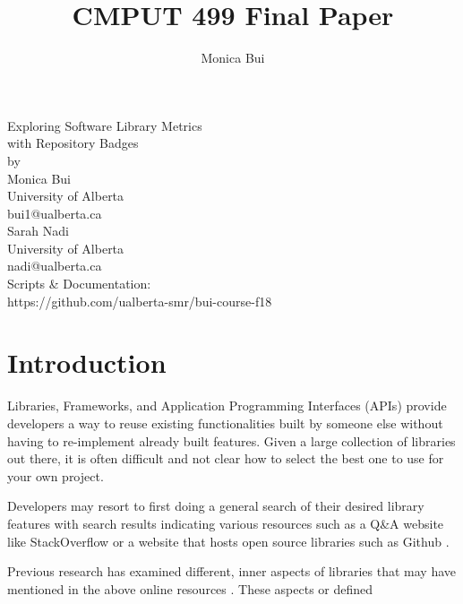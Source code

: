 \documentclass[12pt, letterpaper]{article}
\title{CMPUT 499 Final Paper}
\author{Monica Bui}
\begin{document}
\begin{titlepage}
    \centering
    \large
    \vspace{1cm}
    Exploring Software Library Metrics \\ 
    with Repository Badges \\
    \vspace{1cm}
    by \\
    \vspace{1cm}
    Monica Bui \\
    University of Alberta \\
    bui1@ualberta.ca \\
    \vspace{1cm}
    Sarah Nadi \\
    University of Alberta \\
    nadi@ualberta.ca \\
    \vspace{10cm}
    Scripts \& Documentation: \\
    https://github.com/ualberta-smr/bui-course-f18
\end{titlepage}

\tableofcontents

\listoffigures
\newpage

\section{Introduction} 

Libraries, Frameworks, and Application Programming Interfaces (APIs) provide developers a way to reuse existing functionalities
built by someone else without having to re-implement already built features. Given a large collection of libraries out there,
it is often difficult and not clear how to select the best one to use for your own project. 


Developers may resort to first doing a general search of their desired library features with search results indicating
various resources such as a Q\&A website like StackOverflow \cite{stackoverflow} or a website that hosts open source libraries such as Github \cite{github}.


Previous research has examined different, inner aspects of libraries that may have mentioned in the above
online resources \cite{githubbadges,apiwave,metrics,opinerarticle,analogical}. These aspects or defined 
\end{document}
